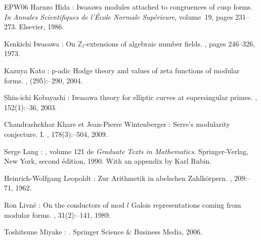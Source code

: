 \documentclass[12pt]{amsart}
\theoremstyle{defstyle}
\theoremstyle{thmstyle}
\begin{document}
\begin{thebibliography}{EPW06}
Haruzo \bgroup\fonteauteurs\bgroup Hida\egroup\egroup{} :
\newblock Iwasawa modules attached to congruences of cusp forms.
\newblock \emph{In} {\em Annales Scientifiques de l'{\'E}cole Normale
  Sup{\'e}rieure}, volume~19, pages 231--273. Elsevier, 1986.

Kenkichi \bgroup\fonteauteurs\bgroup Iwasawa\egroup\egroup{} :
\newblock On $\mathbb{Z}_l$-extensions of algebraic number fields.
, pages 246--326, 1973.

Kazuya \bgroup\fonteauteurs\bgroup Kato\egroup\egroup{} :
\newblock p-adic {H}odge theory and values of zeta functions of modular forms.
, (295)\string:--290, 2004.

Shin-ichi \bgroup\fonteauteurs\bgroup Kobayashi\egroup\egroup{} :
\newblock Iwasawa theory for elliptic curves at supersingular primes.
, 152(1)\string:--36, 2003.

Chandrashekhar \bgroup\fonteauteurs\bgroup Khare\egroup\egroup{} et Jean-Pierre
  \bgroup\fonteauteurs\bgroup Wintenberger\egroup\egroup{} :
\newblock Serre's modularity conjecture. {I}.
, 178(3)\string:--504, 2009.

Serge \bgroup\fonteauteurs\bgroup Lang\egroup\egroup{} :
, volume 121 de {\em Graduate
  Texts in Mathematics}.
\newblock Springer-Verlag, New York, second \'edition, 1990.
\newblock With an appendix by Karl Rubin.

Heinrich-Wolfgang \bgroup\fonteauteurs\bgroup Leopoldt\egroup\egroup{} :
\newblock Zur {A}rithmetik in abelschen {Z}ahlk\"{o}rpern.
, 209\string:--71,
  1962.

Ron \bgroup\fonteauteurs\bgroup Livn\'{e}\egroup\egroup{} :
\newblock On the conductors of mod {$l$} {G}alois representations coming from
  modular forms.
, 31(2)\string:--141,
  1989.

Toshitsune \bgroup\fonteauteurs\bgroup Miyake\egroup\egroup{} :
.
\newblock Springer Science \& Business Media, 2006.


\end{thebibliography}
\end{document}
